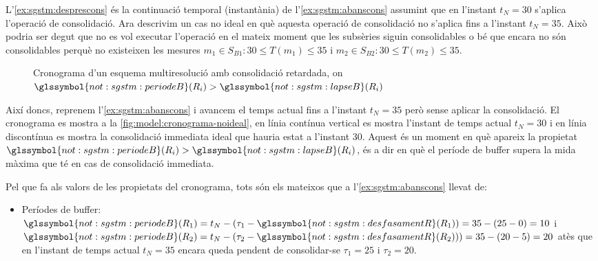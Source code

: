 \begin{example}

  L'\autoref{ex:sgstm:desprescons} és la continuació temporal
  (instantània) de l'\autoref{ex:sgstm:abanscons} assumint que en
  l'instant $t_N=30$ s'aplica l'operació de consolidació.  Ara
  descrivim un cas no ideal en què aquesta operació de consolidació no
  s'aplica fins a l'instant $t_N=35$. Això podria ser degut que no es
  vol executar l'operació en el mateix moment que les subsèries siguin
  consolidables o bé que encara no són consolidables perquè no
  existeixen les mesures $m_1\in S_{B1}: 30\leq T(m_1)\leq 35$ i
  $m_2\in S_{B2}: 30\leq T(m_2)\leq 35$.




\begin{figure}[tp]
  \centering
  
  \caption{Cronograma d'un esquema multiresolució amb consolidació retardada,  on $\glssymbol{not:sgstm:periodeB}(R_i)>\glssymbol{not:sgstm:lapseB}(R_i)$}
  \label{fig:model:cronograma-noideal}
\end{figure}


  Així doncs, reprenem l'\autoref{ex:sgstm:abanscons} i avancem el
  temps actual fins a l'instant $t_N=35$ però sense aplicar la
  consolidació. El cronograma es mostra a la
  \autoref{fig:model:cronograma-noideal}, en línia contínua vertical
  es mostra l'instant de temps actual $t_N=30$ i en línia discontínua
  es mostra la consolidació immediata ideal que hauria estat a
  l'instant $30$.  Aquest és un moment en què apareix la propietat
  $\glssymbol{not:sgstm:periodeB}(R_i)>\glssymbol{not:sgstm:lapseB}(R_i)$,
  és a dir en què el període de buffer supera la mida màxima que té en
  cas de consolidació immediata.



Pel que fa als valors de les propietats del cronograma, tots són els
mateixos que a l'\autoref{ex:sgstm:abanscons} llevat de:
 \begin{itemize}
 \item Períodes de buffer: $\glssymbol{not:sgstm:periodeB}(R_1)
   =t_N-(\tau_1-\glssymbol{not:sgstm:desfasamentR}(R_1))
   =35-(25-0)=10$ i $\glssymbol{not:sgstm:periodeB}(R_2)
   =t_N-(\tau_2-\glssymbol{not:sgstm:desfasamentR}(R_2)))
   =35-(20-5)=20$ atès que en l'instant de temps actual $t_N=35$
   encara queda pendent de consolidar-se $\tau_1=25$ i $\tau_2=20$.
  \end{itemize}

\end{example}



